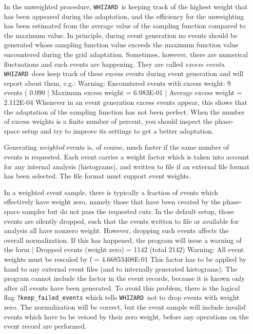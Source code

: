 \documentclass[12pt]{book}
\newenvironment{code}%
  {\begingroup\footnotesize
   \quote
   \Verbatim}%
  {\endVerbatim
   \endquote
   \endgroup\noindent}
\newcommand{\ttt}[1]{\texttt{#1}}
\newcommand{\whizard}{\ttt{WHIZARD}}
\begin{document}
In the unweighted procedure, \whizard\ is keeping track of the highest
weight that has been appeared during the adaptation, and the
efficiency for the unweighting has been estimated from the average
value of the sampling function compared to the maximum value. In
principle, during event generation no events should be generated whose
sampling function value exceeds the maximum function value encountered
during the grid adaptation. Sometimes, however, there are numerical
fluctuations and such events are happening. They are called {\em
excess events}. \whizard\ does keep track of these excess events
during event generation and will report about them, e.g.:
\begin{code}
Warning: Encountered events with excess weight: 9 events (  0.090 %
| Maximum excess weight = 6.083E-01
| Average excess weight = 2.112E-04
\end{code}
Whenever in an event generation excess events appear, this shows that
the adaptation of the sampling function has not been perfect. When the
number of excess weights is a finite number of percent, you should
inspect the phase-space setup and try to improve its settings to get a
better adaptation.

Generating \emph{weighted} events is, of course, much faster if the
same number of events is requested.  Each event carries a weight
factor which is taken into account for any internal analysis
(histograms), and written to file if an external file format has been
selected.  The file format must support event weights.

In a weighted event sample, there is typically a fraction of events
which effectively have weight zero, namely those that have been
created by the phase-space sampler but do not pass the requested
cuts.  In the default setup, those events are silently dropped, such
that the events written to file or available for analysis all have
nonzero weight.  However, dropping such events affects the overall
normalization.  If this has happened, the program will issue a warning
of the form
\begin{code}
| Dropped events (weight zero) = 1142 (total 2142)
Warning: All event weights must be rescaled by f = 4.66853408E-01
\end{code}
This factor has to be applied by hand to any external event files (and
to internally generated histograms).  The program cannot include the
factor in the event records, because it is known only after all events
have been generated.  To avoid this problem, there is the logical flag
\ttt{?keep\_failed\_events} which tells \whizard\ not to drop events with
weight zero.  The normalization will be correct, but the event sample
will include invalid events which have to be vetoed by their zero
weight, before any operations on the event record are performed.
\end{document}
